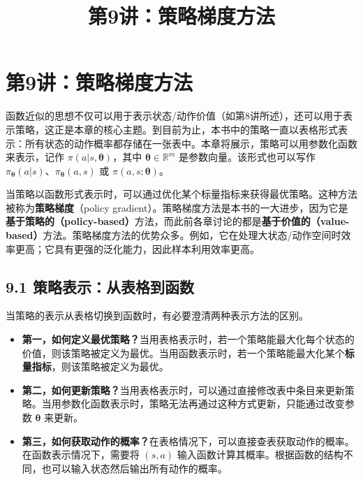 \documentclass[UTF8]{article}
\title{第9讲：策略梯度方法}
\author{}
\date{}
\begin{document}
\maketitle
\thispagestyle{empty}

\section*{第9讲：策略梯度方法}

函数近似的思想不仅可以用于表示状态/动作价值（如第8讲所述），还可以用于表示策略，这正是本章的核心主题。到目前为止，本书中的策略一直以表格形式表示：所有状态的动作概率都存储在一张表中。本章将展示，策略可以用参数化函数来表示，记作 $\pi(a|s, \boldsymbol{\theta})$，其中 $\boldsymbol{\theta} \in \mathbb{R}^m$ 是参数向量。该形式也可以写作 $\pi_{\boldsymbol{\theta}}(a|s)$、$\pi_{\boldsymbol{\theta}}(a,s)$ 或 $\pi(a,s;\boldsymbol{\theta})$。

当策略以函数形式表示时，可以通过优化某个标量指标来获得最优策略。这种方法被称为\textbf{策略梯度}（policy gradient）。策略梯度方法是本书的一大进步，因为它是\textbf{基于策略的（policy-based）}方法，而此前各章讨论的都是\textbf{基于价值的（value-based）}方法。策略梯度方法的优势众多。例如，它在处理大状态/动作空间时效率更高；它具有更强的泛化能力，因此样本利用效率更高。

\subsection*{9.1 策略表示：从表格到函数}

当策略的表示从表格切换到函数时，有必要澄清两种表示方法的区别。

\begin{itemize}
    \item \textbf{第一，如何定义最优策略？}当用表格表示时，若一个策略能最大化每个状态的价值，则该策略被定义为最优。当用函数表示时，若一个策略能最大化某个\textbf{标量指标}，则该策略被定义为最优。
    \item \textbf{第二，如何更新策略？}当用表格表示时，可以通过直接修改表中条目来更新策略。当用参数化函数表示时，策略无法再通过这种方式更新，只能通过改变参数 $\boldsymbol{\theta}$ 来更新。
    \item \textbf{第三，如何获取动作的概率？}在表格情况下，可以直接查表获取动作的概率。在函数表示情况下，需要将 $(s,a)$ 输入函数计算其概率。根据函数的结构不同，也可以输入状态然后输出所有动作的概率。
\end{itemize}
\end{document}
